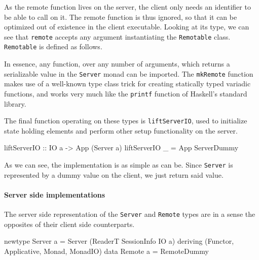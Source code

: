 \documentclass[preprint]{sigplanconf}
\begin{document}
As the remote function lives on the server, the client only needs an
identifier to be able to call on it. The remote function is thus ignored,
so that it can be optimized out of existence in the client executable. Looking
at its type, we can see that \lstinline!remote! accepts any argument
instantiating the \lstinline!Remotable! class.
\lstinline!Remotable! is defined as follows.


In essence, any function, over any number of arguments, which returns a
serializable value in the \lstinline!Server! monad can be imported. The
\lstinline!mkRemote! function makes use of a well-known type class trick for
creating statically typed variadic functions, and works very much like the
\lstinline!printf! function of Haskell's standard library.\ \cite{printf}

The final function operating on these types is \lstinline!liftServerIO!, used
to initialize state holding elements and perform other setup functionality on
the server.

\begin{code}
liftServerIO :: IO a -> App (Server a)
liftServerIO _ = App ServerDummy
\end{code}

As we can see, the implementation is as simple as can be. Since
\lstinline!Server! is represented by a dummy value on the client, we
just return said value.

\paragraph{Server side implementations}
The server side representation of the \lstinline!Server! and
\lstinline!Remote! types are in a sense the opposites of their client side
counterparts.

\begin{code}
newtype Server a = Server (ReaderT SessionInfo IO a)
  deriving (Functor, Applicative, Monad, MonadIO)
data Remote a = RemoteDummy
\end{code}
\end{document}

